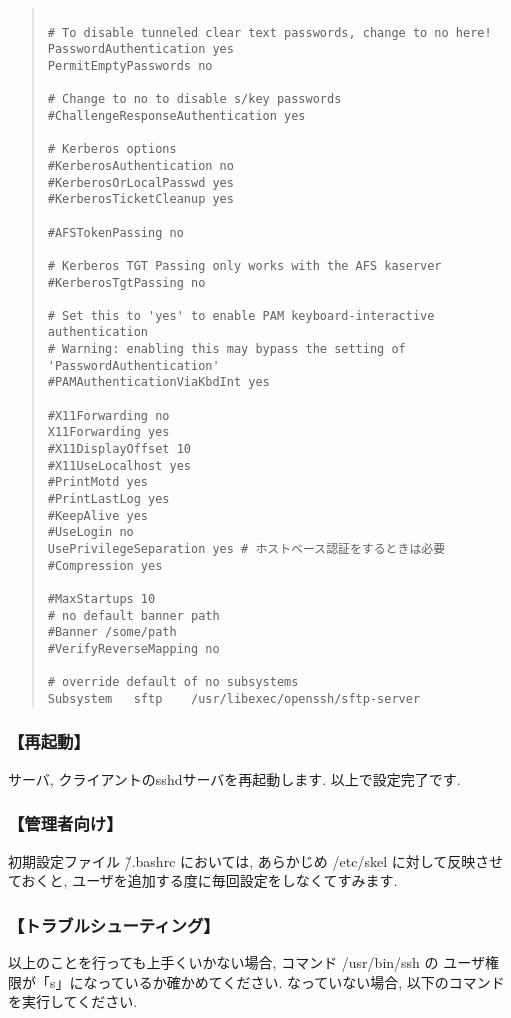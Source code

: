 \documentclass[a4paper,titlepage]{jreport}
\begin{document}
\newpage

\begin{quote}
\begin{screen}
\begin{verbatim}

# To disable tunneled clear text passwords, change to no here!
PasswordAuthentication yes
PermitEmptyPasswords no

# Change to no to disable s/key passwords
#ChallengeResponseAuthentication yes

# Kerberos options
#KerberosAuthentication no
#KerberosOrLocalPasswd yes
#KerberosTicketCleanup yes

#AFSTokenPassing no

# Kerberos TGT Passing only works with the AFS kaserver
#KerberosTgtPassing no

# Set this to 'yes' to enable PAM keyboard-interactive authentication 
# Warning: enabling this may bypass the setting of 'PasswordAuthentication'
#PAMAuthenticationViaKbdInt yes

#X11Forwarding no
X11Forwarding yes
#X11DisplayOffset 10
#X11UseLocalhost yes
#PrintMotd yes
#PrintLastLog yes
#KeepAlive yes
#UseLogin no
UsePrivilegeSeparation yes # ホストベース認証をするときは必要
#Compression yes

#MaxStartups 10
# no default banner path
#Banner /some/path
#VerifyReverseMapping no

# override default of no subsystems
Subsystem	sftp	/usr/libexec/openssh/sftp-server
\end{verbatim}
\end{screen}
\end{quote}

\subsubsection{【再起動】}
サーバ, クライアントのsshdサーバを再起動します. 以上で設定完了です.

\subsubsection{【管理者向け】}
初期設定ファイル \~/.bashrc においては, あらかじめ /etc/skel に対して反映させておくと,
ユーザを追加する度に毎回設定をしなくてすみます.

\subsubsection{【トラブルシューティング】}
以上のことを行っても上手くいかない場合, コマンド /usr/bin/ssh の
ユーザ権限が「s」になっているか確かめてください. なっていない場合, 
以下のコマンドを実行してください.
\end{document}
